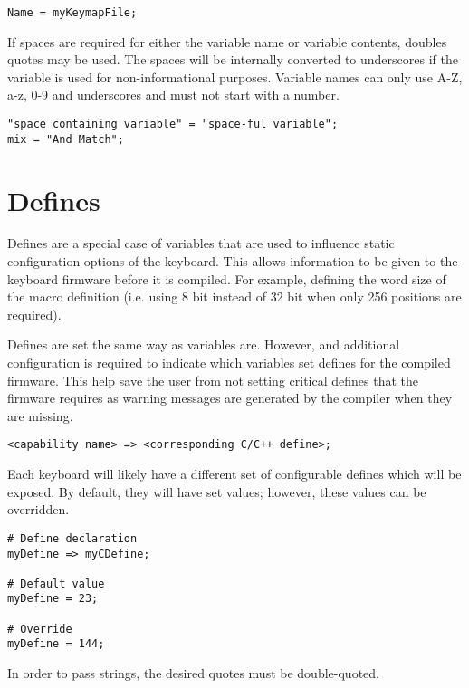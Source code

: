 \documentclass{kiibohd-template}
\begin{document}
\begin{lstlisting}
Name = myKeymapFile;
\end{lstlisting}

If spaces are required for either the variable name or variable contents, doubles quotes may be used.
The spaces will be internally converted to underscores if the variable is used for non-informational purposes.
Variable names can only use A-Z, a-z, 0-9 and underscores and must not start with a number.

\begin{lstlisting}
"space containing variable" = "space-ful variable";
mix = "And Match";
\end{lstlisting}


\section{Defines}
\label{sec:Defines}

Defines are a special case of variables that are used to influence static configuration options of the keyboard.
This allows information to be given to the keyboard firmware before it is compiled.
For example, defining the word size of the macro definition (i.e. using 8 bit instead of 32 bit when only 256 positions are required).

Defines are set the same way as variables are.
However, and additional configuration is required to indicate which variables set defines for the compiled firmware.
This help save the user from not setting critical defines that the firmware requires as warning messages are generated by the compiler when they are missing.

\begin{lstlisting}
<capability name> => <corresponding C/C++ define>;
\end{lstlisting}

Each keyboard will likely have a different set of configurable defines which will be exposed.
By default, they will have set values; however, these values can be overridden.

\begin{lstlisting}
# Define declaration
myDefine => myCDefine;

# Default value
myDefine = 23;

# Override
myDefine = 144;
\end{lstlisting}

In order to pass strings, the desired quotes must be double-quoted.
\end{document}
